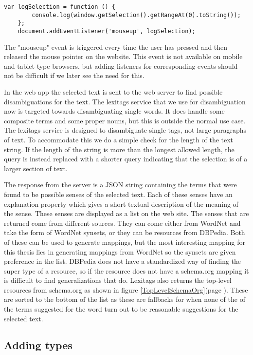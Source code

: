 \begin{lstlisting}[caption={Logging selected text}, label=DOMSelection]
	var logSelection = function () {
		console.log(window.getSelection().getRangeAt(0).toString());
	};
	document.addEventListener('mouseup', logSelection);
\end{lstlisting}

The "mouseup" event is triggered every time the user has pressed and then released the mouse pointer on the website.
This event is not available on mobile and tablet type browsers,
but adding listeners for corresponding events should not be difficult if we later see the need for this.

In the web app the selected text is sent to the web server to find possible disambiguations for the text.
The lexitags service that we use for disambiguation now is targeted towards disambiguating single words.
It does handle some composite terms and some proper nouns, but this is outside the normal use case.
The lexitags service is designed to disambiguate single tags, not large paragraphs of text.
To accommodate this we do a simple check for the length of the text string.
If the length of the string is more than the longest allowed length,
the query is instead replaced with a shorter query indicating that the selection is of a larger section of text.

The response from the server is a JSON string containing the terms that were found to be possible senses of the selected text.
Each of these senses have an explanation property which gives a short textual description of the meaning of the sense.
These senses are displayed as a list on the web site.
The senses that are returned come from different sources.
They can come either from WordNet and take the form of WordNet synsets, or they can be resources from DBPedia.
Both of these can be used to generate mappings,
but the most interesting mapping for this thesis lies in generating mappings from WordNet so the synsets are given preference in the list.
DBPedia does not have a standardized way of finding the super type of a resource,
so if the resource does not have a schema.org mapping it is difficult to find generalizations that do.
Lexitags also returns the top-level resources from schema.org as shown in figure \ref{TopLevelSchemaOrg}(page \pageref{TopLevelSchemaOrg}).
These are sorted to the bottom of the list as these are fallbacks for when none of the of the terms suggested for
the word turn out to be reasonable suggestions for the selected text.

\subsection{Adding types}

